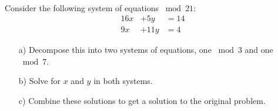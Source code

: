 \documentclass[]{article}
\newif\ifsolutions
\renewcommand{\answer}[1]{{\color{mydarkblue}\textbf{Solution:}#1}}
\begin{document}
\begin{qunlist}
\ifsolutions{ \answer { 
\begin{enumerate}
\item[a)] $2^n$
\item[b)] $4$. $2$ is a factor of $10$ so we will not be able to reach every number simply by taking successive powers of $2$. In particular, $2^5 = 2 \bmod{10}$.
\item[c)] $2^{n+1}-1$. Remember that according to the midterm, when we are working on $\bmod{p}$, $p-1$ is its own inverse, therefore, all numbers multiplied by $p-1$ will be distinct $\bmod{p}$.
\item[d)] $N = pqr$ where $p, q, r$ are all prime. Then, let $e$ be co-prime with $(p-1)(q-1)(r-1)$. Give the public key: $(N, e)$ and calculate $d = e^{-1} \bmod{(p-1)(q-1)(r-1)}$. Does this work? We prove that $x^{ed} - x \equiv 0 \bmod{N}$ and thus $x^{ed} = 1 \bmod{N}$. The argument proceeds almost identically to the one covered in lecture notes.
\item[e)] calculate $d$ such that $de = 2 \bmod{N}$. In other words, $d = (2^{-1}e)^{-1} \bmod{N}$. We wish to prove that $x^{ed} = x^2 \bmod{N}$. We now wish to show that $x^{ed} - x^2 = 0 \bmod{N}$. We now factor out $x^2$ to get $x^2(x^{k(p-1)(q-1)} - 1)$ and the proof continues as the lecture notes of normal RSA.
\end{enumerate}
}}\fi





  



\\   %
Consider the following system of equations $\bmod{21}$:
\begin{align*}
16x &+ 5y &= 14 \\
9x &+ 11y &= 4
\end{align*}

\begin{itemize}  
\qpart
\item[a)] Decompose this into two systems of equations, one $\bmod 3$ and one $\bmod 7$.
\qpart
\item[b)] Solve for $x$ and $y$ in both systems.
\qpart
\item[c)] Combine these solutions to get a solution to the original problem.
\end{itemize}



\end{qunlist}
\end{document}
